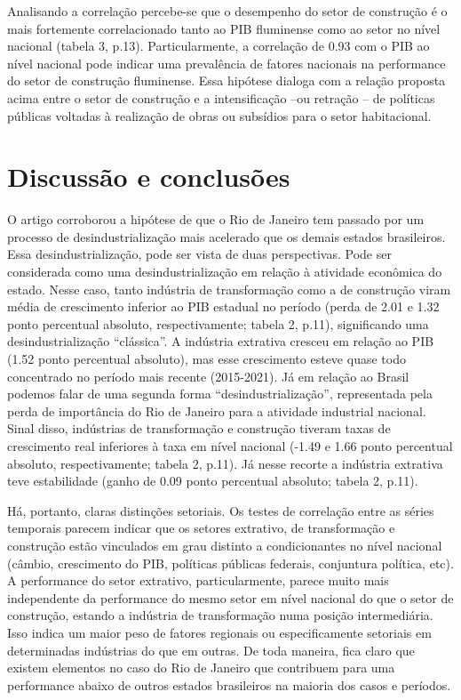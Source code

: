 Analisando a correlação percebe-se que o desempenho do setor de
construção é o mais fortemente correlacionado tanto ao PIB fluminense
como ao setor no nível nacional (tabela 3, p.13). Particularmente, a
correlação de 0.93 com o PIB ao nível nacional pode indicar uma
prevalência de fatores nacionais na performance do setor de construção
fluminense. Essa hipótese dialoga com a relação proposta acima entre o
setor de construção e a intensificação --ou retração -- de políticas
públicas voltadas à realização de obras ou subsídios para o setor
habitacional.

\section{Discussão e conclusões}

O artigo corroborou a hipótese de que o Rio de Janeiro tem passado por
um processo de desindustrialização mais acelerado que os demais estados
brasileiros. Essa desindustrialização, pode ser vista de duas
perspectivas. Pode ser considerada como uma desindustrialização em
relação à atividade econômica do estado. Nesse caso, tanto indústria de
transformação como a de construção viram média de crescimento inferior
ao PIB estadual no período (perda de 2.01 e 1.32 ponto percentual
absoluto, respectivamente; tabela 2, p.11), significando uma
desindustrialização ``clássica''. A indústria extrativa cresceu em
relação ao PIB (1.52 ponto percentual absoluto), mas esse crescimento
esteve quase todo concentrado no período mais recente (2015-2021). Já em
relação ao Brasil podemos falar de uma segunda forma
``desindustrialização'', representada pela perda de importância do Rio
de Janeiro para a atividade industrial nacional. Sinal disso, indústrias
de transformação e construção tiveram taxas de crescimento real
inferiores à taxa em nível nacional (-1.49 e 1.66 ponto percentual
absoluto, respectivamente; tabela 2, p.11). Já nesse recorte a indústria
extrativa teve estabilidade (ganho de 0.09 ponto percentual absoluto;
tabela 2, p.11).

Há, portanto, claras distinções setoriais. Os testes de correlação entre
as séries temporais parecem indicar que os setores extrativo, de
transformação e construção estão vinculados em grau distinto a
condicionantes no nível nacional (câmbio, crescimento do PIB, políticas
públicas federais, conjuntura política, etc). A performance do setor
extrativo, particularmente, parece muito mais independente da
performance do mesmo setor em nível nacional do que o setor de
construção, estando a indústria de transformação numa posição
intermediária. Isso indica um maior peso de fatores regionais ou
especificamente setoriais em determinadas indústrias do que em outras.
De toda maneira, fica claro que existem elementos no caso do Rio de
Janeiro que contribuem para uma performance abaixo de outros estados
brasileiros na maioria dos casos e períodos.

